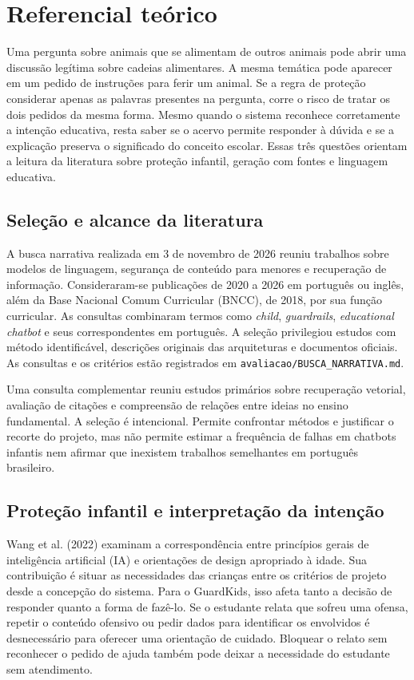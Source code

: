 \chapter{Referencial teórico}\label{cap:referencial}

Uma pergunta sobre animais que se alimentam de outros animais pode abrir uma discussão legítima sobre cadeias alimentares. A mesma temática pode aparecer em um pedido de instruções para ferir um animal. Se a regra de proteção considerar apenas as palavras presentes na pergunta, corre o risco de tratar os dois pedidos da mesma forma. Mesmo quando o sistema reconhece corretamente a intenção educativa, resta saber se o acervo permite responder à dúvida e se a explicação preserva o significado do conceito escolar. Essas três questões orientam a leitura da literatura sobre proteção infantil, geração com fontes e linguagem educativa.

\section{Seleção e alcance da literatura}

A busca narrativa realizada em 3 de novembro de 2026 reuniu trabalhos sobre modelos de linguagem, segurança de conteúdo para menores e recuperação de informação. Consideraram-se publicações de 2020 a 2026 em português ou inglês, além da Base Nacional Comum Curricular (BNCC), de 2018, por sua função curricular. As consultas combinaram termos como \textit{child}, \textit{guardrails}, \textit{educational chatbot} e seus correspondentes em português. A seleção privilegiou estudos com método identificável, descrições originais das arquiteturas e documentos oficiais. As consultas e os critérios estão registrados em \nolinkurl{avaliacao/BUSCA_NARRATIVA.md}.

Uma consulta complementar reuniu estudos primários sobre recuperação vetorial, avaliação de citações e compreensão de relações entre ideias no ensino fundamental. A seleção é intencional. Permite confrontar métodos e justificar o recorte do projeto, mas não permite estimar a frequência de falhas em chatbots infantis nem afirmar que inexistem trabalhos semelhantes em português brasileiro.

\section{Proteção infantil e interpretação da intenção}

Wang et al. (2022) examinam a correspondência entre princípios gerais de inteligência artificial (IA) e orientações de design apropriado à idade. Sua contribuição é situar as necessidades das crianças entre os critérios de projeto desde a concepção do sistema. Para o GuardKids, isso afeta tanto a decisão de responder quanto a forma de fazê-lo. Se o estudante relata que sofreu uma ofensa, repetir o conteúdo ofensivo ou pedir dados para identificar os envolvidos é desnecessário para oferecer uma orientação de cuidado. Bloquear o relato sem reconhecer o pedido de ajuda também pode deixar a necessidade do estudante sem atendimento.


